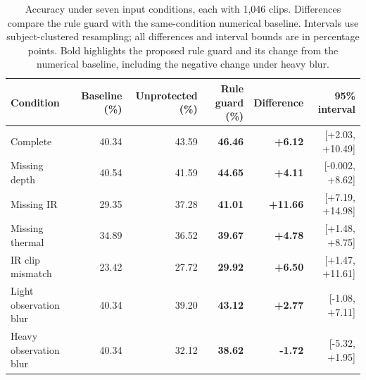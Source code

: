 \begin{table}[pos=t]
\caption{Accuracy under seven input conditions, each with 1,046 clips. Differences compare the rule guard with the same-condition numerical baseline. Intervals use subject-clustered resampling; all differences and interval bounds are in percentage points. Bold highlights the proposed rule guard and its change from the numerical baseline, including the negative change under heavy blur.}
\label{tab:results_robustness}
\centering\small
\begin{tabular}{@{}lrrrrr@{}}
\toprule
Condition & Baseline (\%) & Unprotected (\%) & Rule guard (\%) & Difference & 95\% interval \\
\midrule
Complete & 40.34 & 43.59 & \textbf{46.46} & \textbf{+6.12} & [+2.03, +10.49] \\
Missing depth & 40.54 & 41.59 & \textbf{44.65} & \textbf{+4.11} & [-0.002, +8.62] \\
Missing IR & 29.35 & 37.28 & \textbf{41.01} & \textbf{+11.66} & [+7.19, +14.98] \\
Missing thermal & 34.89 & 36.52 & \textbf{39.67} & \textbf{+4.78} & [+1.48, +8.75] \\
IR clip mismatch & 23.42 & 27.72 & \textbf{29.92} & \textbf{+6.50} & [+1.47, +11.61] \\
Light observation blur & 40.34 & 39.20 & \textbf{43.12} & \textbf{+2.77} & [-1.08, +7.11] \\
Heavy observation blur & 40.34 & 32.12 & \textbf{38.62} & \textbf{-1.72} & [-5.32, +1.95] \\
\bottomrule
\end{tabular}
\end{table}
